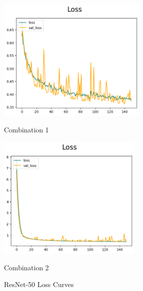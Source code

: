 \begin{figure}[H]
    \centering
    \begin{minipage}[b]{0.49\textwidth}
        \centering
        \includegraphics[width=\textwidth, height=6cm]{Figures/balanced_data/more_data/withoutbn/resnet/loss.png}
        \captionsetup{labelformat=empty}
        \caption{Combination 1}
        \label{fig:u_wo_r_l}
    \end{minipage}
    \hfill
    \begin{minipage}[b]{0.49\textwidth}
        \centering
        \includegraphics[width=\textwidth, height=6cm]{Figures/balanced_data/more_data/withbn/resnet/loss.png}
        \captionsetup{labelformat=empty}
        \caption{Combination 2}
        \label{fig:u_w_r_l}
    \end{minipage}
    \captionsetup{labelformat=default}
    \caption{ResNet-50 Loss Curves}
\end{figure}

